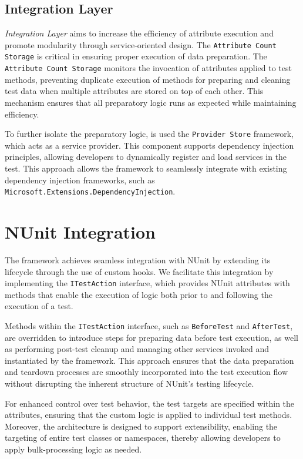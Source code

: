 \subsection{Integration Layer}
\textit{Integration Layer} aims to increase the efficiency of attribute execution and promote modularity through service-oriented design.
The \texttt{Attribute Count Storage} is critical in ensuring proper execution of data preparation. The \texttt{Attribute Count Storage} monitors the invocation of attributes applied to test methods, preventing duplicate execution of methods for preparing and cleaning test data when multiple attributes are stored on top of each other. This mechanism ensures that all preparatory logic runs as expected while maintaining efficiency.

To further isolate the preparatory logic, is used the \texttt{Provider Store} framework, which acts as a service provider. This component supports dependency injection principles, allowing developers to dynamically register and load services in the test. This approach allows the framework to seamlessly integrate with existing dependency injection frameworks, such as \texttt{Microsoft.Extensions.DependencyInjection}.


\section{NUnit Integration}
The framework achieves seamless integration with NUnit by extending its lifecycle through the use of custom hooks. We facilitate this integration by implementing the \texttt{ITestAction} interface, which provides NUnit attributes with methods that enable the execution of logic both prior to and following the execution of a test.

Methods within the \texttt{ITestAction} interface, such as \texttt{BeforeTest} and \texttt{AfterTest}, are overridden to introduce steps for preparing data before test execution, as well as performing post-test cleanup and managing other services invoked and instantiated by the framework. This approach ensures that the data preparation and teardown processes are smoothly incorporated into the test execution flow without disrupting the inherent structure of NUnit's testing lifecycle.

For enhanced control over test behavior, the test targets are specified within the attributes, ensuring that the custom logic is applied to individual test methods. Moreover, the architecture is designed to support extensibility, enabling the targeting of entire test classes or namespaces, thereby allowing developers to apply bulk-processing logic as needed.

